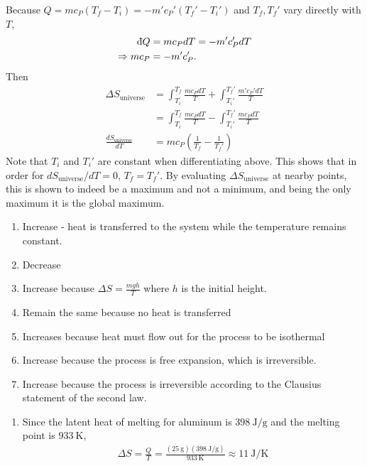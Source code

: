 \documentclass[a4paper,12pt]{article}
\def\dbar{{\mathchar'26\mkern-12mu \mathrm{d}}}
\begin{document}
\begin{enumerate}[label=\textbf{[\arabic*]}]
    \item
        Because $Q = mc_P(T_f - T_i) = -m'c_P'(T_f' - T_i')$ and $T_f, T_f'$ vary directly with $T$,
        \begin{align*}
            \dbar Q &= mc_P dT = -m'c_P' dT \\
            \Rightarrow mc_P &= -m'c_P'.
        \end{align*}
        Then
        \begin{align*}
            \Delta S_{\text{universe}} &= \int_{T_i}^{T_f} \frac{mc_PdT}{T} + \int_{T_i'}^{T_f'} \frac{m' c_P' dT}{T} \\
            &= \int_{T_i}^{T_f} \frac{mc_PdT}{T} - \int_{T_i'}^{T_f'} \frac{mc_PdT}{T} \\
            \frac{dS_{\text{universe}}}{dT} &= mc_P \left( \frac{1}{T_f} - \frac{1}{T_f'} \right)
        \end{align*}
        Note that $T_i$ and $T_i'$ are constant when differentiating above. This shows that in order for $dS_{\text{universe}} / dT = 0$, $T_f = T_f'$. By evaluating $\Delta S_{\text{universe}}$ at nearby points, this is shown to indeed be a maximum and not a minimum, and being the only maximum it is the global maximum.

    \item
        \begin{enumerate}
            \item
                Increase - heat is transferred to the system while the temperature remains constant.
            \item
                Decrease
            \item
                Increase because $\Delta S = \frac{mgh}{T}$ where $h$ is the initial height.
            \item
                Remain the same because no heat is transferred
            \item
                Increases because heat must flow out for the process to be isothermal
            \item
                Increase because the process is free expansion, which is irreversible.
            \item
                Increase because the process is irreversible according to the Clausius statement of the second law.
        \end{enumerate}

    \item
        \begin{enumerate}
            \item
                Since the latent heat of melting for aluminum is $\SI{398}{\J\per\g}$ and the melting point is $\SI{933}{\K}$,
                \begin{align*}
                    \Delta S = \frac{Q}{T} = \frac{(\SI{25}{\g}) (\SI{398}{\J\per\g})}{\SI{933}{\K}} \approx \SI{11}{\J\per\K}
                \end{align*}


\end{enumerate}
\end{enumerate}
\end{document}
